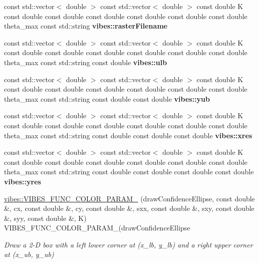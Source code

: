 \begin{DoxyCompactItemize}
\item 
\mbox{\label{group__drawing_ga50c5c52f202bd280a1bda72fae63dd72}} 
const std\+::vector$<$ double $>$ const std\+::vector$<$ double $>$ const double K const double const double const double const double const double const double theta\+\_\+max const std\+::string {\bfseries vibes\+::raster\+Filename}
\item 
\mbox{\label{group__drawing_ga1435d754216240fd1ad5e2edd1d507d1}} 
const std\+::vector$<$ double $>$ const std\+::vector$<$ double $>$ const double K const double const double const double const double const double const double theta\+\_\+max const std\+::string const double {\bfseries vibes\+::ulb}
\item 
\mbox{\label{group__drawing_ga36e18ae9eff8f00475e07d68af804506}} 
const std\+::vector$<$ double $>$ const std\+::vector$<$ double $>$ const double K const double const double const double const double const double const double theta\+\_\+max const std\+::string const double const double {\bfseries vibes\+::yub}
\item 
\mbox{\label{group__drawing_ga9f6f7ab389744365cd66733e822a29a6}} 
const std\+::vector$<$ double $>$ const std\+::vector$<$ double $>$ const double K const double const double const double const double const double const double theta\+\_\+max const std\+::string const double const double const double {\bfseries vibes\+::xres}
\item 
\mbox{\label{group__drawing_ga01d84b279290e04cacb5abf0d43cecc9}} 
const std\+::vector$<$ double $>$ const std\+::vector$<$ double $>$ const double K const double const double const double const double const double const double theta\+\_\+max const std\+::string const double const double const double const double {\bfseries vibes\+::yres}
\item 
\hyperlink{group__drawing_gaa1a216c77912e57296d3092253e0b2e4}{vibes\+::\+V\+I\+B\+E\+S\+\_\+\+F\+U\+N\+C\+\_\+\+C\+O\+L\+O\+R\+\_\+\+P\+A\+R\+A\+M\+\_} (draw\+Confidence\+Ellipse, const double \&, cx, const double \&, cy, const double \&, sxx, const double \&, sxy, const double \&, syy, const double \&, K) V\+I\+B\+E\+S\+\_\+\+F\+U\+N\+C\+\_\+\+C\+O\+L\+O\+R\+\_\+\+P\+A\+R\+A\+M\+\_(draw\+Confidence\+Ellipse
\begin{DoxyCompactList}\small\item\em Draw a 2-\/D box with a left lower corner at ({\itshape x\+\_\+lb}, {\itshape y\+\_\+lb}) and a right upper corner at ({\itshape x\+\_\+ub}, {\itshape y\+\_\+ub}) \end{DoxyCompactList}\item 

\end{DoxyCompactItemize}
